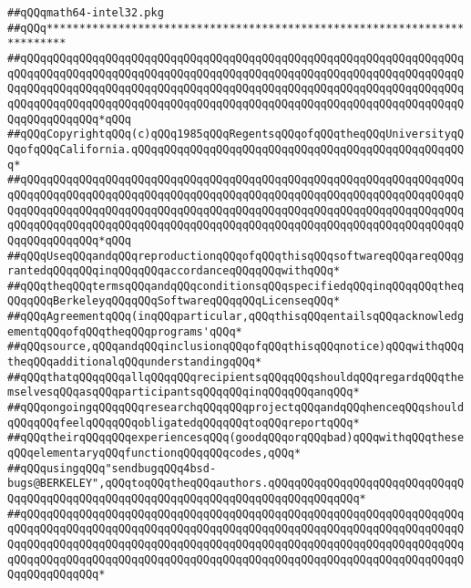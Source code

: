 \label{src/lib/std/src/math64-intel32.pkg}
\verb|##qQQqmath64-intel32.pkg|\newline
\verb|##qQQq*************************************************************************|\newline
\verb|##qQQqqQQqqQQqqQQqqQQqqQQqqQQqqQQqqQQqqQQqqQQqqQQqqQQqqQQqqQQqqQQqqQQqqQQqqQQqqQQqqQQqqQQqqQQqqQQqqQQqqQQqqQQqqQQqqQQqqQQqqQQqqQQqqQQqqQQqqQQqqQQqqQQqqQQqqQQqqQQqqQQqqQQqqQQqqQQqqQQqqQQqqQQqqQQqqQQqqQQqqQQqqQQqqQQqqQQqqQQqqQQqqQQqqQQqqQQqqQQqqQQqqQQqqQQqqQQqqQQqqQQqqQQqqQQqqQQqqQQqqQQqqQQqqQQq*qQQq|\newline
\verb|##qQQqCopyrightqQQq(c)qQQq1985qQQqRegentsqQQqofqQQqtheqQQqUniversityqQQqofqQQqCalifornia.qQQqqQQqqQQqqQQqqQQqqQQqqQQqqQQqqQQqqQQqqQQqqQQqqQQq*|\newline
\verb|##qQQqqQQqqQQqqQQqqQQqqQQqqQQqqQQqqQQqqQQqqQQqqQQqqQQqqQQqqQQqqQQqqQQqqQQqqQQqqQQqqQQqqQQqqQQqqQQqqQQqqQQqqQQqqQQqqQQqqQQqqQQqqQQqqQQqqQQqqQQqqQQqqQQqqQQqqQQqqQQqqQQqqQQqqQQqqQQqqQQqqQQqqQQqqQQqqQQqqQQqqQQqqQQqqQQqqQQqqQQqqQQqqQQqqQQqqQQqqQQqqQQqqQQqqQQqqQQqqQQqqQQqqQQqqQQqqQQqqQQqqQQqqQQqqQQq*qQQq|\newline
\verb|##qQQqUseqQQqandqQQqreproductionqQQqofqQQqthisqQQqsoftwareqQQqareqQQqgrantedqQQqqQQqinqQQqqQQqaccordanceqQQqqQQqwithqQQq*|\newline
\verb|##qQQqtheqQQqtermsqQQqandqQQqconditionsqQQqspecifiedqQQqinqQQqqQQqtheqQQqqQQqBerkeleyqQQqqQQqSoftwareqQQqqQQqLicenseqQQq*|\newline
\verb|##qQQqAgreementqQQq(inqQQqparticular,qQQqthisqQQqentailsqQQqacknowledgementqQQqofqQQqtheqQQqprograms'qQQq*|\newline
\verb|##qQQqsource,qQQqandqQQqinclusionqQQqofqQQqthisqQQqnotice)qQQqwithqQQqtheqQQqadditionalqQQqunderstandingqQQq*|\newline
\verb|##qQQqthatqQQqqQQqallqQQqqQQqrecipientsqQQqqQQqshouldqQQqregardqQQqthemselvesqQQqasqQQqparticipantsqQQqqQQqinqQQqqQQqanqQQq*|\newline
\verb|##qQQqongoingqQQqqQQqresearchqQQqqQQqprojectqQQqandqQQqhenceqQQqshouldqQQqqQQqfeelqQQqqQQqobligatedqQQqqQQqtoqQQqreportqQQq*|\newline
\verb|##qQQqtheirqQQqqQQqexperiencesqQQq(goodqQQqorqQQqbad)qQQqwithqQQqtheseqQQqelementaryqQQqfunctionqQQqqQQqcodes,qQQq*|\newline
\verb|##qQQqusingqQQq"sendbugqQQq4bsd-bugs@BERKELEY",qQQqtoqQQqtheqQQqauthors.qQQqqQQqqQQqqQQqqQQqqQQqqQQqqQQqqQQqqQQqqQQqqQQqqQQqqQQqqQQqqQQqqQQqqQQqqQQqqQQqqQQq*|\newline
\verb|##qQQqqQQqqQQqqQQqqQQqqQQqqQQqqQQqqQQqqQQqqQQqqQQqqQQqqQQqqQQqqQQqqQQqqQQqqQQqqQQqqQQqqQQqqQQqqQQqqQQqqQQqqQQqqQQqqQQqqQQqqQQqqQQqqQQqqQQqqQQqqQQqqQQqqQQqqQQqqQQqqQQqqQQqqQQqqQQqqQQqqQQqqQQqqQQqqQQqqQQqqQQqqQQqqQQqqQQqqQQqqQQqqQQqqQQqqQQqqQQqqQQqqQQqqQQqqQQqqQQqqQQqqQQqqQQqqQQqqQQqqQQqqQQqqQQq*|\newline
